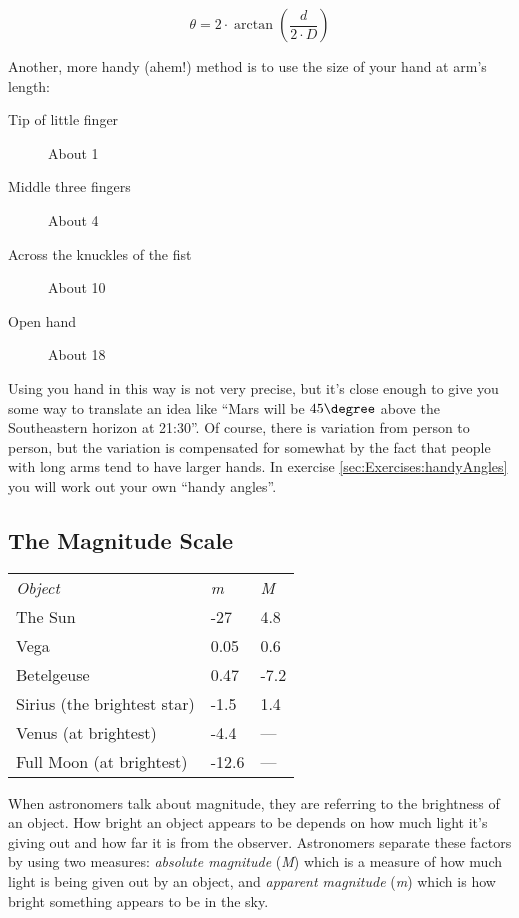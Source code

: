 \begin{equation}
\theta=2 \cdot \arctan{\left(\frac{d}{2 \cdot D}\right) }
\end{equation}


\noindent Another, more handy (ahem!) method is to use the size of your hand at
arm's length:

\begin{description}
\item[Tip of little finger] About 1\degree 
\item[Middle three fingers] About 4\degree 
\item[Across the knuckles of the fist] About 10\degree 
\item[Open hand] About 18\degree
\end{description}

Using you hand in this way is not very precise, but it's close enough to
give you some way to translate an idea like ``Mars will be $45\degree$ above the
Southeastern horizon at 21:30''. Of course, there is variation from
person to person, but the variation is compensated for somewhat by the
fact that people with long arms tend to have larger hands. In exercise
\ref{sec:Exercises:handyAngles} 
you will work out your own ``handy angles''.



\subsection{The Magnitude Scale}\label{the-magnitude-scale}

\begin{longtable}[c]{@{}lll@{}}
\toprule
\emph{Object} & \emph{m} & \emph{M}\tabularnewline
The Sun & -27 & 4.8\tabularnewline
Vega & 0.05 & 0.6\tabularnewline
Betelgeuse & 0.47 & -7.2\tabularnewline
Sirius (the brightest star) & -1.5 & 1.4\tabularnewline
Venus (at brightest) & -4.4 & ---\tabularnewline
Full Moon (at brightest) & -12.6 & ---\tabularnewline
\bottomrule
\end{longtable}

When astronomers talk about magnitude, they are referring to the
brightness of an object. How bright an object appears to be depends on
how much light it's giving out and how far it is from the observer.
Astronomers separate these factors by using two measures: \emph{absolute
magnitude} (\emph{M}) which is a measure of how much light is being
given out by an object, and \emph{apparent magnitude} (\emph{m}) which
is how bright something appears to be in the sky.


